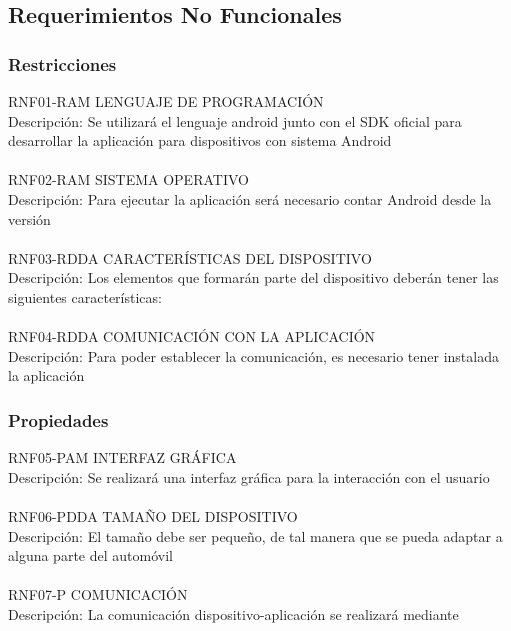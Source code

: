 \subsection{Requerimientos No Funcionales}
  
  \subsubsection{Restricciones}
  
  RNF01-RAM  LENGUAJE DE PROGRAMACIÓN
  \\Descripción: Se utilizará el lenguaje android junto con el SDK oficial para desarrollar la aplicación
  para dispositivos con sistema Android
  \\ \\RNF02-RAM  SISTEMA OPERATIVO
  \\Descripción: Para ejecutar la aplicación será necesario contar Android desde la versión
  \\ \\RNF03-RDDA CARACTERÍSTICAS DEL DISPOSITIVO
  \\Descripción: Los elementos que formarán parte del dispositivo deberán tener las siguientes características:
  \\ \\RNF04-RDDA COMUNICACIÓN CON LA APLICACIÓN
  \\Descripción: Para poder establecer la comunicación, es necesario tener instalada la aplicación


  \subsubsection{Propiedades}
  
  RNF05-PAM INTERFAZ GRÁFICA
  \\Descripción: Se realizará una interfaz gráfica para la interacción con el usuario
  \\ \\RNF06-PDDA  TAMAÑO DEL DISPOSITIVO
  \\Descripción: El tamaño debe ser pequeño, de tal manera que se pueda adaptar a alguna parte del automóvil
  \\ \\RNF07-P     COMUNICACIÓN
  \\Descripción: La comunicación dispositivo-aplicación se realizará mediante
